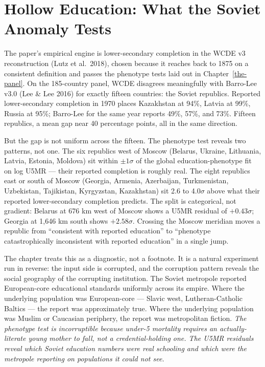 \documentclass[12pt,letterpaper]{article}
\begin{document}
\section{Hollow Education: What the Soviet Anomaly Tests}\label{goskomstat-anomaly}

The paper's empirical engine is lower-secondary completion in the
WCDE v3 reconstruction (Lutz et al.\ 2018), chosen because it reaches
back to 1875 on a consistent definition and passes the phenotype
tests laid out in Chapter~\ref{the-panel}. On the 185-country panel,
WCDE disagrees meaningfully with Barro-Lee v3.0 (Lee \& Lee 2016) for
exactly fifteen countries: the Soviet republics. Reported
lower-secondary completion in 1970 places Kazakhstan at 94\%, Latvia
at 99\%, Russia at 95\%;
Barro-Lee for the same year reports 49\%, 57\%, and 73\%. Fifteen
republics, a mean gap near 40 percentage points, all in the same
direction.

But the gap is not uniform across the fifteen. The phenotype test
reveals two patterns, not one. The six republics west of Moscow
(Belarus, Ukraine, Lithuania, Latvia, Estonia, Moldova) sit within
$\pm 1\sigma$ of the global education-phenotype fit on log U5MR ---
their reported completion is roughly real. The eight republics east
or south of Moscow (Georgia, Armenia, Azerbaijan, Turkmenistan,
Uzbekistan, Tajikistan, Kyrgyzstan, Kazakhstan) sit 2.6 to 4.0$\sigma$
above what their reported lower-secondary completion predicts. The
split is categorical,
not gradient: Belarus at 676 km west of Moscow shows a U5MR residual
of $+0.43\sigma$; Georgia at 1{,}646 km south shows $+2.58\sigma$.
Crossing the Moscow meridian moves a republic from ``consistent with
reported education'' to ``phenotype catastrophically inconsistent
with reported education'' in a single jump.

The chapter treats this as a diagnostic, not a footnote. It is a
natural experiment run in reverse: the input side is corrupted, and
the corruption pattern reveals the social geography of the corrupting
institution. The Soviet metropole reported European-core educational
standards uniformly across its empire. Where the underlying
population was European-core --- Slavic west, Lutheran-Catholic
Baltics --- the report was approximately true. Where the underlying
population was Muslim or Caucasian periphery, the report was
metropolitan fiction. \emph{The phenotype test is incorruptible
because under-5 mortality requires an actually-literate young mother
to fall, not a credential-holding one. The U5MR residuals reveal
which Soviet education numbers were real schooling and which were the
metropole reporting on populations it could not see.}
\end{document}
